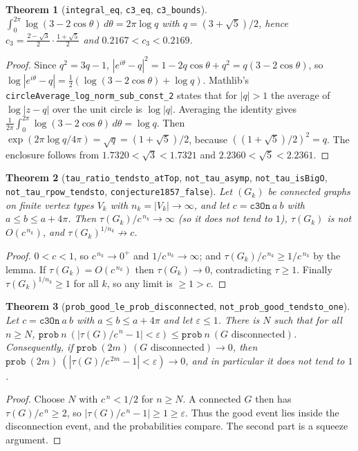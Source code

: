 \documentclass[11pt]{article}
\newtheorem{theorem}{Theorem}
\theoremstyle{definition}
\begin{document}
\begin{theorem}[\texttt{integral\_eq}, \texttt{c3\_eq}, \texttt{c3\_bounds}]
$\int_0^{2\pi}\log(3-2\cos\theta)\,d\theta=2\pi\log q$ with $q=(3+\sqrt5)/2$, hence
$c_3=\frac{2-\sqrt3}{2}\cdot\frac{1+\sqrt5}{2}$ and $0.2167<c_3<0.2169$.
\end{theorem}
\begin{proof}
Since $q^2=3q-1$, $|e^{i\theta}-q|^2=1-2q\cos\theta+q^2=q(3-2\cos\theta)$, so
$\log|e^{i\theta}-q|=\tfrac12(\log(3-2\cos\theta)+\log q)$. Mathlib's
\texttt{circleAverage\_log\_norm\_sub\_const\_2} states that for $|q|>1$ the average of
$\log|z-q|$ over the unit circle is $\log|q|$. Averaging the identity gives
$\frac1{2\pi}\int_0^{2\pi}\log(3-2\cos\theta)\,d\theta=\log q$. Then
$\exp(2\pi\log q/4\pi)=\sqrt q=(1+\sqrt5)/2$, because $((1+\sqrt5)/2)^2=q$. The enclosure follows
from $1.7320<\sqrt3<1.7321$ and $2.2360<\sqrt5<2.2361$.
\end{proof}

\begin{theorem}[\texttt{tau\_ratio\_tendsto\_atTop}, \texttt{not\_tau\_asymp}, \texttt{not\_tau\_isBigO}, \texttt{not\_tau\_rpow\_tendsto}, \texttt{conjecture1857\_false}]
Let $(G_k)$ be connected graphs on finite vertex types $V_k$ with $n_k=|V_k|\to\infty$, and let
$c=\mathtt{c3On}\ a\ b$ with $a\le b\le a+4\pi$. Then $\tau(G_k)/c^{\,n_k}\to\infty$ (so it does not
tend to $1$), $\tau(G_k)$ is not $O(c^{\,n_k})$, and $\tau(G_k)^{1/n_k}\not\to c$.
\end{theorem}
\begin{proof}
$0<c<1$, so $c^{\,n_k}\to0^+$ and $1/c^{\,n_k}\to\infty$; and $\tau(G_k)/c^{\,n_k}\ge1/c^{\,n_k}$ by
the lemma. If $\tau(G_k)=O(c^{\,n_k})$ then $\tau(G_k)\to0$, contradicting $\tau\ge1$. Finally
$\tau(G_k)^{1/n_k}\ge1$ for all $k$, so any limit is $\ge1>c$.
\end{proof}

\begin{theorem}[\texttt{prob\_good\_le\_prob\_disconnected}, \texttt{not\_prob\_good\_tendsto\_one}]
Let $c=\mathtt{c3On}\ a\ b$ with $a\le b\le a+4\pi$ and let $\varepsilon\le1$. There is $N$ such
that for all $n\ge N$,
$\mathtt{prob}\ n\ (|\tau(G)/c^{\,n}-1|<\varepsilon)\le\mathtt{prob}\ n\ (G\text{ disconnected})$.
Consequently, if $\mathtt{prob}\ (2m)\ (G\text{ disconnected})\to0$, then
$\mathtt{prob}\ (2m)\ (|\tau(G)/c^{\,2m}-1|<\varepsilon)\to0$, and in particular it does not tend
to $1$.
\end{theorem}
\begin{proof}
Choose $N$ with $c^{\,n}<1/2$ for $n\ge N$. A connected $G$ then has $\tau(G)/c^{\,n}\ge2$, so
$|\tau(G)/c^{\,n}-1|\ge1\ge\varepsilon$. Thus the good event lies inside the disconnection event,
and the probabilities compare. The second part is a squeeze argument.
\end{proof}
\end{document}
